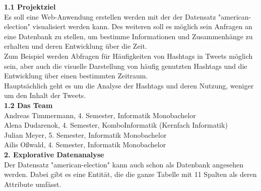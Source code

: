 \documentclass[a4paper ,8pt,x11names]{article}
\begin{document}
\begin{flushleft}
\vspace{0.25cm}
\textbf{1.1 Projektziel}
\vspace{0.25cm}\\
Es soll eine Web-Anwendung erstellen werden mit der der Datensatz "american-election" visualisiert werden kann. Des weiteren soll es möglich sein Anfragen an eine Datenbank zu stellen, um bestimme Informationen und Zusammenhänge zu erhalten und deren Entwicklung über die Zeit.\\
Zum Beispiel werden Abfragen für Häufigkeiten von Hashtags in Tweets möglich sein, aber auch die visuelle Darstellung von häufig genutzten Hashtags und die Entwicklung über einen bestimmten Zeitraum.\\ 
Hauptsächlich geht es um die Analyse der Hashtags und deren Nutzung, weniger um den Inhalt der Tweets.
\vspace{0.25cm}\\
\textbf{1.2 Das Team}
\vspace{0.25cm}\\
Andreas Timmermann, 4. Semester, Informatik Monobachelor\\
Alena Dudarenok, 4. Semester, KomboInformatik (Kernfach Informatik)\\
Julian Meyer, 5. Semester, Informatik Monobachelor\\
Ailis Oßwald, 4. Semester, Informatik Monobachelor
\vspace{0.25cm}\\
\textbf{2. Explorative Datenanalyse}
\vspace{0.25cm}\\
Der Datensatz "american-election" kann auch schon als Datenbank angesehen werden. Dabei gibt es eine Entität, die die ganze Tabelle mit 11 Spalten als deren Attribute umfässt.\\


\end{flushleft}
\end{document}
